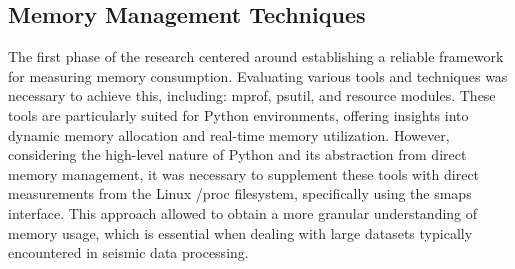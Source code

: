 \subsection{Memory Management Techniques}


The first phase of the research centered around establishing a reliable framework for measuring memory consumption.
Evaluating various tools and techniques was necessary to achieve this, including: mprof, psutil, and resource modules.
These tools are particularly suited for Python environments, offering insights into dynamic memory allocation and real-time memory utilization.
However, considering the high-level nature of Python and its abstraction from direct memory management, it was necessary to supplement these tools with direct measurements from the Linux /proc filesystem, specifically using the smaps interface.
This approach allowed to obtain a more granular understanding of memory usage, which is essential when dealing with large datasets typically encountered in seismic data processing.